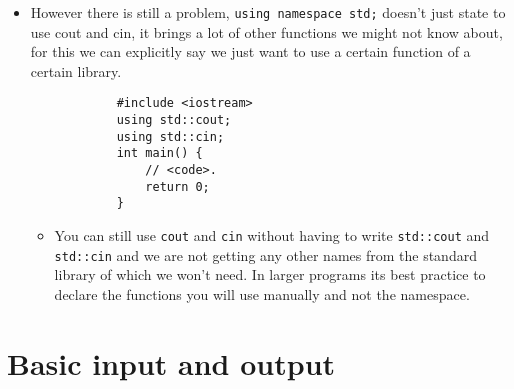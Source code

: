 \begin{itemize}
    \item However there is still a problem, \texttt{using namespace std;} doesn't just state to use cout and cin, it brings a lot of other functions we might not know about, for this we can explicitly say we just want to use a certain function of a certain library.
        \begin{verbatim}
            #include <iostream> 
            using std::cout;
            using std::cin;
            int main() {
                // <code>.
                return 0;
            }
        \end{verbatim}
        \begin{itemize}
            \item You can still use \texttt{cout} and \texttt{cin} without having to write \texttt{std::cout} and \texttt{std::cin} and we are not getting any other names from the standard library of which we won't need. In larger programs its best practice to declare the functions you will use manually and not the namespace.
        \end{itemize}
\end{itemize}


\section{Basic input and output  }
